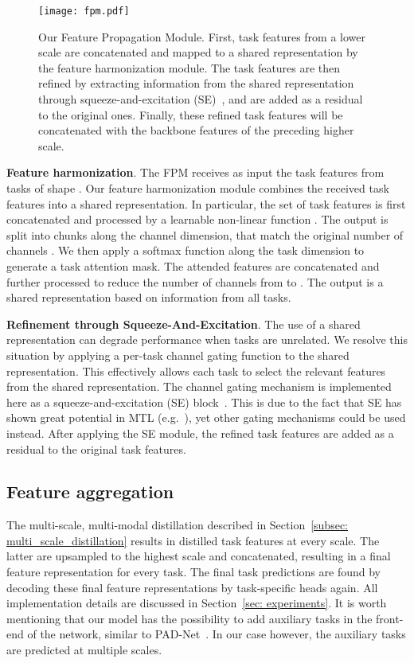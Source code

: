 \documentclass[runningheads]{llncs}
\begin{document}
\begin{figure}[t]
\centering
\texttt{[image: fpm.pdf]}
\caption{Our Feature Propagation Module. First, task features from a lower scale are concatenated and mapped to a shared representation by the feature harmonization module. The task features are then refined by extracting information from the shared representation through squeeze-and-excitation (SE)~\cite{hu2018squeeze}, and are added as a residual to the original ones. Finally, these refined task features will be concatenated with the backbone features of the preceding higher scale.}
\label{fig: feature_propagation}
\end{figure}

\noindent\textbf{Feature harmonization}.
The FPM receives as input the task features from  tasks of shape . Our feature harmonization module combines the received task features into a shared representation. In particular, the set of  task features is first concatenated and processed by a learnable non-linear function . The output is split into  chunks along the channel dimension, that match the original number of channels . We then apply a softmax function along the task dimension to generate a task attention mask. The attended features are concatenated and further processed to reduce the number of channels from  to . The output is a shared representation based on information from all tasks. 

\noindent\textbf{Refinement through Squeeze-And-Excitation}.
The use of a shared representation can degrade performance when tasks are unrelated. We resolve this situation by applying a per-task channel gating function to the shared representation. This effectively allows each task to select the relevant features from the shared representation. The channel gating mechanism is implemented here as a squeeze-and-excitation (SE) block~\cite{hu2018squeeze}. This is due to the fact that SE has shown great potential in MTL (e.g.~\cite{maninis2019attentive}), yet other gating mechanisms could be used instead. After applying the SE module, the refined task features are added as a residual to the original task features. 

\subsection{Feature aggregation}
\label{subsec: feature_aggregation}
The multi-scale, multi-modal distillation described in Section~\ref{subsec: multi_scale_distillation} results in distilled task features at every scale. The latter are upsampled to the highest scale and concatenated, resulting in a final feature representation for every task. The final task predictions are found by decoding these final feature representations by task-specific heads again. All implementation details are discussed in Section~\ref{sec: experiments}. It is worth mentioning that our model has the possibility to add auxiliary tasks in the front-end of the network, similar to PAD-Net~\cite{xu2018pad}. In our case however, the auxiliary tasks are predicted at multiple scales.  
\end{document}
